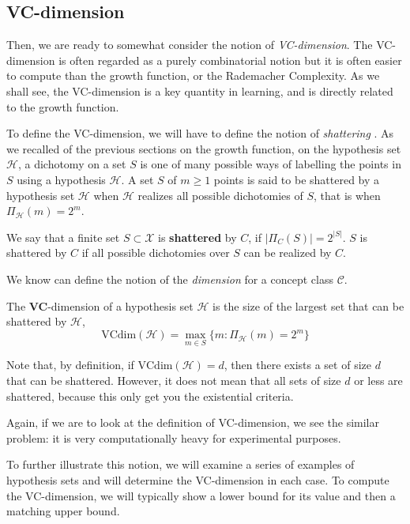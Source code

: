 \subsection{VC-dimension}
Then, we are ready to somewhat consider the notion of \textit{VC-dimension}. The VC-dimension is often regarded as a purely combinatorial notion but it is often easier to compute than the growth function, or the Rademacher Complexity. As we shall see, the VC-dimension is a key quantity in learning, and is directly related to the growth function. 

To define the VC-dimension, we will have to define the notion of \textit{shattering} . As we recalled of the previous sections on the growth function, on the hypothesis set $\mathcal{H}$, a dichotomy on a set $S$ is one of many possible ways of labelling the points in $S$ using a hypothesis $\mathcal{H}$. A set $S$ of $m\geq 1$ points is said to be shattered by a hypothesis set $\mathcal{H}$ when $\mathcal{H}$ realizes all possible dichotomies of $S$, that is when $\Pi_{\mathcal{H}}(m)=2^{m}$. 
\begin{definition}[Shattering]
    We say that a finite set $S\subset \mathcal{X}$ is \textbf{shattered} by $C$, if $|\Pi_{C}(S)|=2^{|S|}$. $S$ is shattered by $C$ if all possible dichotomies over $S$ can be realized by $C$. 
\end{definition}

We know can define the notion of the \textit{dimension} for a concept class $\mathcal{C}$. 
\begin{definition}[VC-dimension]
    The \textbf{VC}-dimension of a hypothesis set $\mathcal{H}$ is the size of the largest set that can be shattered by $\mathcal{H}$, 
    \begin{equation}
        \mathrm{VCdim}(\mathcal{H}) = \max_{m\in S} \{m: \Pi_{\mathcal{H}}(m)=2^{m}\}
    \end{equation}
\end{definition}
Note that, by definition, if $\mathrm{VCdim}(\mathcal{H}) =d$, then there exists a set of size $d$ that can be shattered. However, it does not mean that all sets of size $d$ or less are shattered, because this only get you the existential criteria. 

Again, if we are to look at the definition of VC-dimension, we see the similar problem: it is very computationally heavy for experimental purposes. 

To further illustrate this notion, we will examine a series of examples of hypothesis sets and will determine the VC-dimension in each case. To compute the VC-dimension, we will typically show a lower bound for its value and then a matching upper bound. 

